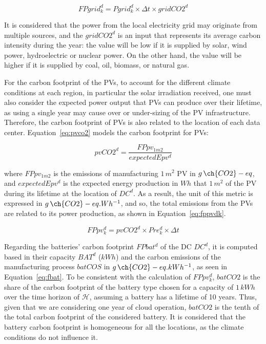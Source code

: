 \begin{equation} \label{eq:fpgrid}
FPgrid_k^d = Pgrid_k^d\times \Delta t \times gridCO2^d
\end{equation}

It is considered that the power from the local electricity grid may originate from multiple sources, and the $gridCO2^d$ is an input that represents its average carbon intensity during the year: the value will be low if it is supplied by solar, wind power, hydroelectric or nuclear power. On the other hand, the value will be higher if it is supplied by coal, oil, biomass, or natural gas.

For the carbon footprint of the PVs, to account for the different climate conditions at each region, in particular the solar irradiation received, one must also consider the expected power output that PVs can produce over their lifetime, as using a single year may cause over or under-sizing of the PV infrastructure. Therefore, the carbon footprint of PVs is also related to the location of each data center. Equation~\eqref{eq:pvco2} models the carbon footprint for PVs:

\begin{equation} \label{eq:pvco2}
   pvCO2^d =  \frac{FPpv_{1m2}}{expectedEpv^d} 
\end{equation}

where $FPpv_{1m2}$ is the emissions of manufacturing $1\,m^2$ PV in $g\,\ch{CO2}-eq$, and $expectedEpv^d$ is the expected energy production in $Wh$ that $1\,m^2$ of the PV during its lifetime at the location of $DC^d$. As a result, the unit of this metric is expressed in $g\,\ch{CO2}-eq.Wh^{-1}$, and so, the total emissions from the PVs are related to its power production, as shown in Equation~\eqref{eq:fppvdk}. 

\begin{equation} \label{eq:fppvdk}
   FPpv^d_k =  pvCO2^d \times Pre_k^d \times \Delta t
\end{equation}


Regarding the batteries' carbon footprint $FPbat^d$ of the DC $DC^d$, it is computed based in their capacity $BAT^d$ ($kWh$) and the carbon emissions of the manufacturing process $batCOS$ in $g\,\ch{CO2}-eq.kWh^{-1}$, as seen in Equation~\eqref{eq:fbat}. To be consistent with the calculation of $FPpv^d_k$, $batCO2$ is the share of the carbon footprint of the battery type chosen for a capacity of $1\,kWh$ over the time horizon of $\mathcal{H}$, assuming a battery has a lifetime of 10 years. Thus, given that we are considering one year of cloud operation, $batCO2$ is the tenth of the total carbon footprint of the considered battery. It is considered that the battery carbon footprint is homogeneous for all the locations, as the climate conditions do not influence it.


